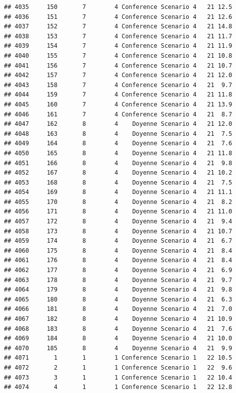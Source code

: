 \documentclass[
]{article}
\begin{document}
\begin{verbatim}
## 4035     150       7        4 Conference Scenario 4   21 12.5
## 4036     151       7        4 Conference Scenario 4   21 12.6
## 4037     152       7        4 Conference Scenario 4   21 14.8
## 4038     153       7        4 Conference Scenario 4   21 11.7
## 4039     154       7        4 Conference Scenario 4   21 11.9
## 4040     155       7        4 Conference Scenario 4   21 10.8
## 4041     156       7        4 Conference Scenario 4   21 10.7
## 4042     157       7        4 Conference Scenario 4   21 12.0
## 4043     158       7        4 Conference Scenario 4   21  9.7
## 4044     159       7        4 Conference Scenario 4   21 11.8
## 4045     160       7        4 Conference Scenario 4   21 13.9
## 4046     161       7        4 Conference Scenario 4   21  8.7
## 4047     162       8        4    Doyenne Scenario 4   21 12.0
## 4048     163       8        4    Doyenne Scenario 4   21  7.5
## 4049     164       8        4    Doyenne Scenario 4   21  7.6
## 4050     165       8        4    Doyenne Scenario 4   21 11.8
## 4051     166       8        4    Doyenne Scenario 4   21  9.8
## 4052     167       8        4    Doyenne Scenario 4   21 10.2
## 4053     168       8        4    Doyenne Scenario 4   21  7.5
## 4054     169       8        4    Doyenne Scenario 4   21 11.1
## 4055     170       8        4    Doyenne Scenario 4   21  8.2
## 4056     171       8        4    Doyenne Scenario 4   21 11.0
## 4057     172       8        4    Doyenne Scenario 4   21  9.4
## 4058     173       8        4    Doyenne Scenario 4   21 10.7
## 4059     174       8        4    Doyenne Scenario 4   21  6.7
## 4060     175       8        4    Doyenne Scenario 4   21  8.4
## 4061     176       8        4    Doyenne Scenario 4   21  8.4
## 4062     177       8        4    Doyenne Scenario 4   21  6.9
## 4063     178       8        4    Doyenne Scenario 4   21  9.7
## 4064     179       8        4    Doyenne Scenario 4   21  9.8
## 4065     180       8        4    Doyenne Scenario 4   21  6.3
## 4066     181       8        4    Doyenne Scenario 4   21  7.0
## 4067     182       8        4    Doyenne Scenario 4   21 10.9
## 4068     183       8        4    Doyenne Scenario 4   21  7.6
## 4069     184       8        4    Doyenne Scenario 4   21 10.0
## 4070     185       8        4    Doyenne Scenario 4   21  9.9
## 4071       1       1        1 Conference Scenario 1   22 10.5
## 4072       2       1        1 Conference Scenario 1   22  9.6
## 4073       3       1        1 Conference Scenario 1   22 10.4
## 4074       4       1        1 Conference Scenario 1   22 12.8

\end{verbatim}
\end{document}
